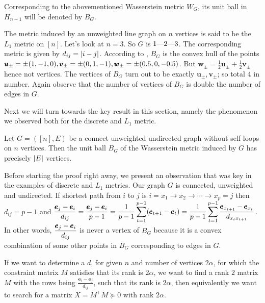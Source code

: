Corresponding to the abovementioned Wasserstein metric $W_{G}$, its unit ball in $H_{n-1}$ will be denoted by $B_{G}$.

\begin{ex}
The metric induced by an unweighted line graph on $n$ vertices is said to be the $L_{1}$ metric on $[n]$. Let's look at $n=3$. So $G$ is $1\text{\textemdash}2\text{\textemdash}3$. The corresponding metric is given by $d_{ij}=\left| i-j \right|$. According to , $B_{G}$ is the convex hull of the points $\displaystyle \pmb u_{\pm} = \pm(1,-1,0), \pmb v_{\pm}=\pm (0,1,-1), \pmb w_{\pm}=\pm(0.5,0,-0.5)$. But $\pmb w_{\pm} = \frac12 \pmb u_{\pm} +\frac12\pmb v_{\pm}$ hence not vertices. The vertices of $B_{G}$ turn out to be exactly $\pmb u_{\pm},\pmb v_{\pm}$; so total $4$ in number. Again observe that the number of vertices of $B_{G}$ is double the number of edges in $G$.
\end{ex}

Next we will turn towards the key result in this section, namely the phenomenon we observed both for the discrete and $L_{1}$ metric.

\begin{thm}
Let $G=([n],E)$ be a connect unweighted undirected graph without self loops on $n$ vertices. Then the unit ball $B_{G}$ of the Wasserstein metric induced by $G$ has precisely $\left| E \right|$ vertices.
\end{thm}

Before starting the proof right away, we present an observation that was key in the examples of discrete and $L_{1}$ metrics. Our graph $G$ is connected, unweighted and undirected. If shortest path from $i$ to $j$ is $i = x_{1} \to x_{2}\to\cdots \to x_{p}=j$ then $d_{ij} = p-1$  and $\displaystyle\frac{\pmb e_{j}-\pmb e_{i}}{d_{ij}} = \frac{\pmb e_{j}-\pmb e_{i}}{p-1} = \frac{1}{p-1} \sum\limits_{t=1}^{p-1}(\pmb e_{t+1}-\pmb e_{t}) = \frac{1}{p-1} \sum\limits_{t=1}^{p-1} \frac{\pmb e_{x_{t+1}}-\pmb e_{x_{t}}}{d_{x_{t}x_{t+1}}}$. In other words, $\displaystyle\frac{\pmb e_{j}-\pmb e_{i}}{d_{ij}}$ is never a vertex of $B_{G}$ because it is a convex combination of some other points in $B_{G}$ corresponding to edges in $G$.

{\color{red}If we want to determine a $d$, for given $n$ and number of vertices $2\alpha$, for which the constraint matrix $M$ satisfies that its rank is $2\alpha$, we want to find a rank $2$ matrix $M$ with the rows being $\frac{\pmb e_{i}-\pmb e_{j}}{d_{ij}}$, such that its rank is $2\alpha$, then equivalently we want to search for a matrix $X=M^{\top}M\succeq 0$ with rank $2\alpha$.}

\newpage
\printbibliography


